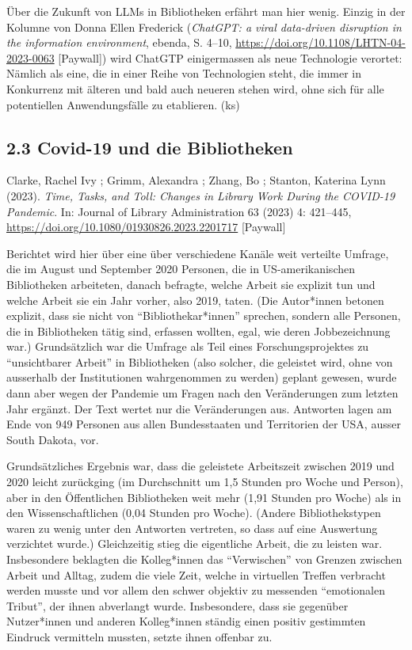 \documentclass[a4paper,
fontsize=11pt,
oneside,
numbers=noperiodatend,
parskip=half-,
bibliography=totoc,
final
]{scrartcl}
\begin{document}
Über die Zukunft von LLMs in Bibliotheken erfährt man hier wenig. Einzig
in der Kolumne von Donna Ellen Frederick (\emph{ChatGPT: a viral
data-driven disruption in the information environment}, ebenda, S.
4--10, \url{https://doi.org/10.1108/LHTN-04-2023-0063} {[}Paywall{]})
wird ChatGTP einigermassen als neue Technologie verortet: Nämlich als
eine, die in einer Reihe von Technologien steht, die immer in Konkurrenz
mit älteren und bald auch neueren stehen wird, ohne sich für alle
potentiellen Anwendungsfälle zu etablieren. (ks)

\hypertarget{covid-19-und-die-bibliotheken}{%
\subsection{2.3 Covid-19 und die
Bibliotheken}\label{covid-19-und-die-bibliotheken}}

Clarke, Rachel Ivy ; Grimm, Alexandra ; Zhang, Bo ; Stanton, Katerina
Lynn (2023). \emph{Time, Tasks, and Toll: Changes in Library Work During
the COVID-19 Pandemic}. In: Journal of Library Administration 63 (2023)
4: 421--445, \url{https://doi.org/10.1080/01930826.2023.2201717}
{[}Paywall{]}

Berichtet wird hier über eine über verschiedene Kanäle weit verteilte
Umfrage, die im August und September 2020 Personen, die in
US-amerikanischen Bibliotheken arbeiteten, danach befragte, welche
Arbeit sie explizit tun und welche Arbeit sie ein Jahr vorher, also
2019, taten. (Die Autor*innen betonen explizit, dass sie nicht von
\enquote{Bibliothekar*innen} sprechen, sondern alle Personen, die in
Bibliotheken tätig sind, erfassen wollten, egal, wie deren
Jobbezeichnung war.) Grundsätzlich war die Umfrage als Teil eines
Forschungsprojektes zu \enquote{unsichtbarer Arbeit} in Bibliotheken
(also solcher, die geleistet wird, ohne von ausserhalb der Institutionen
wahrgenommen zu werden) geplant gewesen, wurde dann aber wegen der
Pandemie um Fragen nach den Veränderungen zum letzten Jahr ergänzt. Der
Text wertet nur die Veränderungen aus. Antworten lagen am Ende von 949
Personen aus allen Bundesstaaten und Territorien der USA, ausser South
Dakota, vor.

Grundsätzliches Ergebnis war, dass die geleistete Arbeitszeit zwischen
2019 und 2020 leicht zurückging (im Durchschnitt um 1,5 Stunden pro
Woche und Person), aber in den Öffentlichen Bibliotheken weit mehr (1,91
Stunden pro Woche) als in den Wissenschaftlichen (0,04 Stunden pro
Woche). (Andere Bibliothekstypen waren zu wenig unter den Antworten
vertreten, so dass auf eine Auswertung verzichtet wurde.) Gleichzeitig
stieg die eigentliche Arbeit, die zu leisten war. Insbesondere beklagten
die Kolleg*innen das \enquote{Verwischen} von Grenzen zwischen Arbeit
und Alltag, zudem die viele Zeit, welche in virtuellen Treffen verbracht
werden musste und vor allem den schwer objektiv zu messenden
\enquote{emotionalen Tribut}, der ihnen abverlangt wurde. Insbesondere,
dass sie gegenüber Nutzer*innen und anderen Kolleg*innen ständig einen
positiv gestimmten Eindruck vermitteln mussten, setzte ihnen offenbar
zu.
\end{document}

